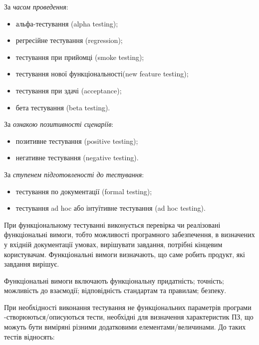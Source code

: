За \emph{часом проведення}:

\begin{itemize}
    \item альфа-тестування (alpha testing);
    \item регресійне тестування (regression);
    \item тестування при прийомці (smoke testing);
    \item тестування нової функціональності(new feature testing);
    \item тестування при здачі (acceptance);
    \item бета тестування (beta testing).
\end{itemize}

За \emph{ознакою позитивності сценаріїв}:

\begin{itemize}
    \item позитивне тестування (positive testing);
    \item негативне тестування (negative testing).
\end{itemize}

За \emph{ступенем підготовленості до тестування}:

\begin{itemize}
    \item тестування по документації (formal testing);
    \item тестування ad hoc або інтуїтивне тестування (ad hoc testing).
\end{itemize}

При функціональному тестуванні виконується перевірка чи реалізовані
функціональні вимоги, тобто можливості програмного забезпечення,
в визначених у вхідній документації умовах, вирішувати завдання,
потрібні кінцевим користувачам. Функціональні вимоги визначають,
що саме робить продукт, які завдання вирішує.

Функціональні вимоги включають функціональну придатність; точність;
можливість до взаємодії; відповідність стандартам та правилам; безпеку.

При необхідності виконання тестування не функціональних параметрів
програми -створюються/описуються тести, необхідні для визначення
характеристик ПЗ, що можуть бути виміряні різними додатковими
елементами/величинами. До таких тестів відносять:

